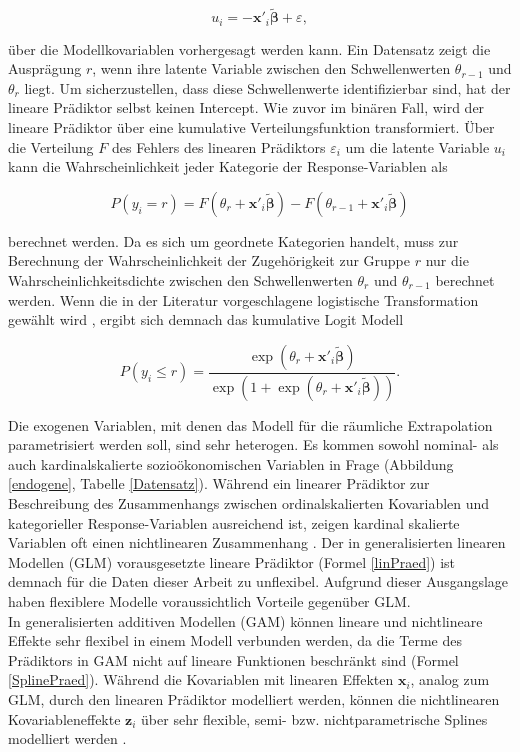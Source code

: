 \documentclass{Vorlage}
\begin{document}
\begin{equation}
u_i=-\mathbf{x}'_i \boldsymbol{\tilde{\beta}}+\varepsilon,
\end{equation}

über die Modellkovariablen vorhergesagt werden kann. Ein Datensatz zeigt die Ausprägung $r$, wenn ihre latente Variable zwischen den Schwellenwerten $\theta_{r-1}$ und $\theta_r$ liegt. Um sicherzustellen, dass diese Schwellenwerte identifizierbar sind, hat der lineare Prädiktor selbst keinen Intercept. Wie zuvor im binären Fall, wird der lineare Prädiktor über eine kumulative Verteilungsfunktion transformiert. Über die Verteilung $F$ des Fehlers des linearen Prädiktors  $\varepsilon_i$ um die latente Variable $u_i$ kann die Wahrscheinlichkeit jeder Kategorie der Response-Variablen als 

\begin{equation}
P(y_i=r)=F(\theta_r+\mathbf{x}'_i \boldsymbol{\tilde{\beta}})-F(\theta_{r-1}+\mathbf{x}'_i \boldsymbol{\tilde{\beta}})
\end{equation}

berechnet werden. Da es sich um geordnete Kategorien handelt, muss zur Berechnung der Wahrscheinlichkeit der Zugehörigkeit zur Gruppe $r$ nur die Wahrscheinlichkeitsdichte zwischen den Schwellenwerten $\theta_{r}$ und $\theta_{r-1}$ berechnet werden. Wenn die in der Literatur vorgeschlagene logistische Transformation gewählt wird \cite[p. 335]{fahrmeir2013regression}, ergibt sich demnach das kumulative Logit Modell

\begin{equation}
P(y_i\leq r)=\frac{\exp(\theta_r+\mathbf{x}'_i \boldsymbol{\tilde{\beta}})}{\exp(1+\exp(\theta_r+\mathbf{x}'_i \boldsymbol{\tilde{\beta}}))}.
\end{equation}

Die exogenen Variablen, mit denen das Modell für die räumliche Extrapolation parametrisiert werden soll, sind sehr heterogen. Es kommen sowohl nominal- als auch kardinalskalierte sozioökonomischen Variablen in Frage (Abbildung \ref{endogene}, Tabelle \ref{Datensatz}). Während ein linearer Prädiktor zur Beschreibung des Zusammenhangs zwischen ordinalskalierten Kovariablen und kategorieller Response-Variablen ausreichend ist, zeigen kardinal skalierte Variablen oft einen nichtlinearen Zusammenhang \cite[p. 9]{fahrmeir2009regression}. Der in generalisierten linearen Modellen (GLM) vorausgesetzte lineare Prädiktor (Formel \ref{linPraed}) ist demnach für die Daten dieser Arbeit zu unflexibel. Aufgrund dieser Ausgangslage haben flexiblere Modelle voraussichtlich Vorteile gegenüber GLM.\\
In generalisierten additiven Modellen (GAM) können lineare und nichtlineare Effekte sehr flexibel in einem Modell verbunden werden, da die Terme des Prädiktors in GAM nicht auf lineare Funktionen beschränkt sind (Formel \ref{SplinePraed}). Während die Kovariablen mit linearen Effekten $\mathbf{x}_i$, analog zum GLM, durch den linearen Prädiktor modelliert werden, können die nichtlinearen Kovariableneffekte $\mathbf{z}_i$ über sehr flexible, semi- bzw. nichtparametrische Splines modelliert werden \cite[p. 1 f.]{wood2016}.
\end{document}
